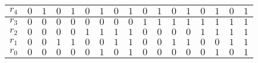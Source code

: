 \documentclass{article}
\begin{document}
\begin{center}
\begin{tabular}{|l|l|l|l|l|l|l|l|l|l|l|l|l|l|l|l|l|}
\hline
\multicolumn{1}{|l|}{$r_{4}$}&	\multicolumn{1}{|l|}{ $0$}&	\multicolumn{1}{|l|}{ $1$}&	\multicolumn{1}{|l|}{ $0$}&	\multicolumn{1}{|l|}{ $1$}&	\multicolumn{1}{|l|}{ $0$}&	\multicolumn{1}{|l|}{ $1$}&	\multicolumn{1}{|l|}{ $0$}&	\multicolumn{1}{|l|}{ $1$}&	\multicolumn{1}{|l|}{ $0$}&	\multicolumn{1}{|l|}{ $1$}&	\multicolumn{1}{|l|}{ $0$}&	\multicolumn{1}{|l|}{ $1$}&	\multicolumn{1}{|l|}{ $0$}&	\multicolumn{1}{|l|}{ $1$}&	\multicolumn{1}{|l|}{ $0$}&	\multicolumn{1}{|l|}{ $1$}	\\
\hline
\multicolumn{1}{|l|}{ $r_{3}$}&	\multicolumn{1}{|l|}{ $0$}&	\multicolumn{1}{|l|}{ $0$}&	\multicolumn{1}{|l|}{ $0$}&	\multicolumn{1}{|l|}{ $0$}&	\multicolumn{1}{|l|}{ $0$}&	\multicolumn{1}{|l|}{ $0$}&	\multicolumn{1}{|l|}{ $0$}&	\multicolumn{1}{|l|}{ $0$}&	\multicolumn{1}{|l|}{ $1$}&	\multicolumn{1}{|l|}{ $1$}&	\multicolumn{1}{|l|}{ $1$}&	\multicolumn{1}{|l|}{ $1$}&	\multicolumn{1}{|l|}{ $1$}&	\multicolumn{1}{|l|}{ $1$}&	\multicolumn{1}{|l|}{ $1$}&	\multicolumn{1}{|l|}{ $1$}	\\
\hline
\multicolumn{1}{|l|}{ $r_{2}$}&	\multicolumn{1}{|l|}{ $0$}&	\multicolumn{1}{|l|}{ $0$}&	\multicolumn{1}{|l|}{ $0$}&	\multicolumn{1}{|l|}{ $0$}&	\multicolumn{1}{|l|}{ $1$}&	\multicolumn{1}{|l|}{ $1$}&	\multicolumn{1}{|l|}{ $1$}&	\multicolumn{1}{|l|}{ $1$}&	\multicolumn{1}{|l|}{ $0$}&	\multicolumn{1}{|l|}{ $0$}&	\multicolumn{1}{|l|}{ $0$}&	\multicolumn{1}{|l|}{ $0$}&	\multicolumn{1}{|l|}{ $1$}&	\multicolumn{1}{|l|}{ $1$}&	\multicolumn{1}{|l|}{ $1$}&	\multicolumn{1}{|l|}{ $1$}	\\
\hline
\multicolumn{1}{|l|}{ $r_{1}$}&	\multicolumn{1}{|l|}{ $0$}&	\multicolumn{1}{|l|}{ $0$}&	\multicolumn{1}{|l|}{ $1$}&	\multicolumn{1}{|l|}{ $1$}&	\multicolumn{1}{|l|}{ $0$}&	\multicolumn{1}{|l|}{ $0$}&	\multicolumn{1}{|l|}{ $1$}&	\multicolumn{1}{|l|}{ $1$}&	\multicolumn{1}{|l|}{ $0$}&	\multicolumn{1}{|l|}{ $0$}&	\multicolumn{1}{|l|}{ $1$}&	\multicolumn{1}{|l|}{ $1$}&	\multicolumn{1}{|l|}{ $0$}&	\multicolumn{1}{|l|}{ $0$}&	\multicolumn{1}{|l|}{ $1$}&	\multicolumn{1}{|l|}{ $1$}	\\
\hline
\multicolumn{1}{|l|}{ $r_{0}$}&	\multicolumn{1}{|l|}{ $0$}&	\multicolumn{1}{|l|}{ $0$}&	\multicolumn{1}{|l|}{ $0$}&	\multicolumn{1}{|l|}{ $0$}&	\multicolumn{1}{|l|}{ $0$}&	\multicolumn{1}{|l|}{ $1$}&	\multicolumn{1}{|l|}{ $0$}&	\multicolumn{1}{|l|}{ $1$}&	\multicolumn{1}{|l|}{ $0$}&	\multicolumn{1}{|l|}{ $0$}&	\multicolumn{1}{|l|}{ $0$}&	\multicolumn{1}{|l|}{ $0$}&	\multicolumn{1}{|l|}{ $0$}&	\multicolumn{1}{|l|}{ $1$}&	\multicolumn{1}{|l|}{ $0$}&	\multicolumn{1}{|l|}{ $1$}	\\
\hline
\end{tabular}

\end{center}
\medbreak
\end{document}
